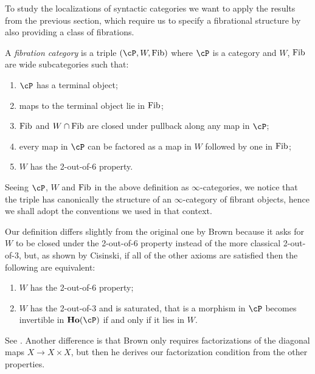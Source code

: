 To study the localizations of syntactic categories we want to apply
the results from the previous section, which require us to specify a
fibrational structure by also providing a class
of fibrations.

\begin{defn}
  A \emph{fibration category} is a triple $(\cP,W,\fib)$ where $\cP$ is a
  category and $W$, $\operatorname{Fib}$ are wide subcategories such that:
  \begin{enumerate}
    \item $\cP$ has a terminal object;
    \item maps to the terminal object lie in $\operatorname{Fib}$;
    \item $\operatorname{Fib}$ and $W\cap \operatorname{Fib}$ are closed under pullback along any map in $\cP$;
    \item every map in $\cP$ can be factored as a map in $W$ followed by one in
      $\operatorname{Fib}$;
    \item $W$ has the 2-out-of-6 property.
  \end{enumerate}
\end{defn}

\begin{rmk}
  Seeing $\cP$, $W$ and $\operatorname{Fib}$ in the above definition as $\infty$-categories, we
  notice that the triple has canonically the structure of an $\infty$-category
  of fibrant objects, hence we shall adopt the conventions we used in that
  context.
\end{rmk}

\begin{rmk}
  Our definition differs slightly from the original one by Brown
  because it asks for $W$ to be closed under the 2-out-of-6 property
  instead of the more classical 2-out-of-3, but, as shown by
  Cisinski, if all of
  the other axioms are satisfied then the following are equivalent:
  \begin{enumerate}
    \item $W$ has the 2-out-of-6 property;
    \item $W$ has the 2-out-of-3 and is saturated, that is a morphism in $\cP$
      becomes invertible in $\ho(\cP)$ if and only if it lies in $W$.
  \end{enumerate}
  See \cite[Thm.~7.2.7]{RB06}. Another difference is that Brown only requires
  factorizations of the diagonal maps $X\rightarrow X\times X$, but then he
  derives our factorization condition from the other properties.
\end{rmk}

